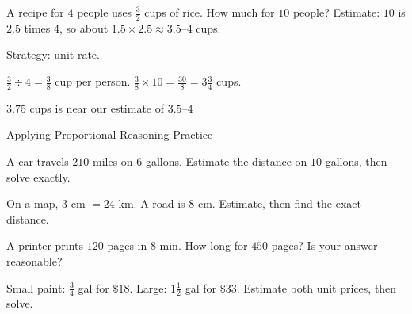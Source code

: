 \begin{stepExample}{A recipe for $4$ people uses $\frac{3}{2}$ cups of rice. How much for $10$ people?}
     Estimate: $10$ is $2.5$ times $4$, so about $1.5 \times 2.5 \approx 3.5$--$4$ cups.

     Strategy: unit rate.

     $\frac{3}{2} \div 4 = \frac{3}{8}$ cup per person. \; $\frac{3}{8} \times 10 = \frac{30}{8} = 3\frac{3}{4}$ cups.

     $3.75$ cups is near our estimate of $3.5$--$4$ \checkmark
\end{stepExample}


\newpage
\begin{stepPractice}{Applying Proportional Reasoning Practice}
    \resetProblems

    \prob A car travels $210$ miles on $6$ gallons. Estimate the distance on $10$ gallons, then solve exactly. \answerBlank[2.5cm]

    \prob On a map, $3$ cm $= 24$ km. A road is $8$ cm. Estimate, then find the exact distance. \answerBlank[2.5cm]

    \prob A printer prints $120$ pages in $8$ min. How long for $450$ pages? Is your answer reasonable? \answerBlank[2.5cm]

    \prob Small paint: $\frac{3}{4}$ gal for $\$18$. Large: $1\frac{1}{2}$ gal for $\$33$. Estimate both unit prices, then solve. \answerBlank[3cm]

\end{stepPractice}

